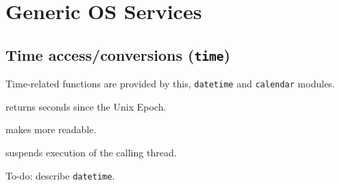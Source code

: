 \section{Generic OS Services}
\subsection{Time access/conversions (\texttt{time})}
Time-related functions are provided by this, \texttt{datetime} and \texttt{calendar} modules.

\begin{compactenum}
	\item {} returns seconds since the Unix Epoch.

	\item {} makes  more readable.

	\item {} suspends execution of the calling thread.
\end{compactenum}

To-do: describe \texttt{datetime}.